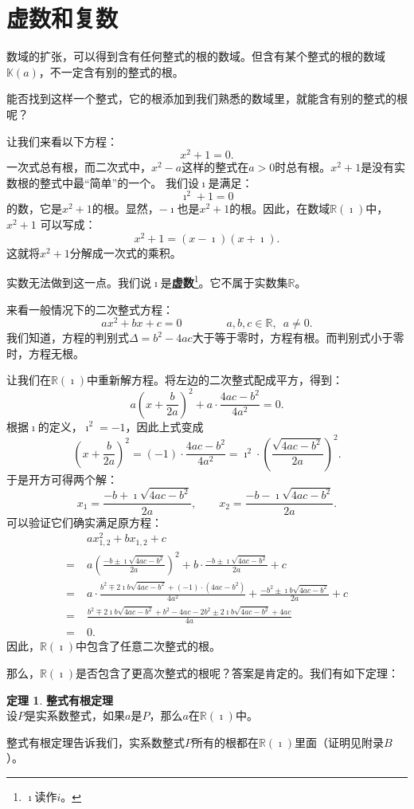 \documentclass[12pt,UTF8]{ctexbook}
\theoremstyle{definition}
\newtheorem{tm}{定理}[section]
\theoremstyle{plain}
\begin{document}
\section{虚数和复数}

数域的扩张，可以得到含有任何整式的根的数域。但含有某个整式的根的数域$\mathbb{K}(a)$，不一定含有别的整式的根。

能否找到这样一个整式，它的根添加到我们熟悉的数域里，就能含有别的整式的根呢？

让我们来看以下方程：
$$ x^2 + 1 = 0.$$
一次式总有根，而二次式中，$x^2 - a$这样的整式在$a>0$时总有根。$x^2 + 1$是没有实数根的整式中最“简单”的一个。
我们设$\imath$是满足：
$$ \imath^2 + 1 = 0$$
的数，它是$x^2 + 1$的根。显然，$-\imath$也是$x^2 + 1$的根。因此，在数域$\mathbb{R}(\imath)$中，$x^2 + 1$
可以写成：
$$ x^2 + 1 = (x - \imath)(x + \imath).$$
这就将$x^2 + 1$分解成一次式的乘积。

实数无法做到这一点。我们说$\imath$是\textbf{虚数}\footnote{$\imath$读作$i$。}。它不属于实数集$\mathbb{R}$。

来看一般情况下的二次整式方程：
$$ ax^2 + bx + c = 0  \qquad \qquad a,b,c \in \mathbb{R}, \,\,\, a \neq 0. $$
我们知道，方程的判别式$\Delta = b^2 - 4ac$大于等于零时，方程有根。而判别式小于零时，方程无根。

让我们在$\mathbb{R}(\imath)$中重新解方程。将左边的二次整式配成平方，得到：
$$ a(x + \frac{b}{2a})^2 + a\cdot \frac{4ac - b^2}{4a^2} = 0. $$
根据$\imath$的定义，$\imath^2 = -1$，因此上式变成
$$ \left(x + \frac{b}{2a}\right)^2 = (-1) \cdot \frac{4ac - b^2}{4a^2} = \imath^2 \cdot \left(\frac{\sqrt{4ac - b^2}}{2a}\right)^2. $$
于是开方可得两个解：
$$ x_1 = \frac{-b + \imath \sqrt{4ac - b^2} }{2a}, \qquad x_2 = \frac{-b - \imath \sqrt{4ac - b^2} }{2a}. $$
可以验证它们确实满足原方程：
\begin{align*}
     &\; ax_{1,2}^2 + b x_{1,2} + c  \\
    =&\; a\left(\frac{-b \pm \imath \sqrt{4ac - b^2} }{2a}\right)^2 + b\cdot \frac{-b \pm \imath \sqrt{4ac - b^2} }{2a} + c \\
    =&\; a \cdot \frac{b^2 \mp 2\imath b \sqrt{4ac - b^2} + (-1)\cdot (4ac - b^2) }{4a^2} + \frac{-b^2 \pm \imath b \sqrt{4ac - b^2} }{2a} + c \\
    =&\; \frac{b^2 \mp 2\imath b \sqrt{4ac - b^2} + b^2 - 4ac -2b^2 \pm 2 \imath b \sqrt{4ac - b^2} + 4ac }{4a} \\
    =&\; 0.
\end{align*}
因此，$\mathbb{R}(\imath)$中包含了任意二次整式的根。

那么，$\mathbb{R}(\imath)$是否包含了更高次整式的根呢？答案是肯定的。我们有如下定理：
\begin{tm}{\textbf{整式有根定理}}
    \mbox{} \\
    \indent 设$P$是实系数整式，如果$a$是$P$，那么$a$在$\mathbb{R}(\imath)$中。
\end{tm}
整式有根定理告诉我们，实系数整式$P$所有的根都在$\mathbb{R}(\imath)$里面（证明见附录$B$）。
\end{document}
